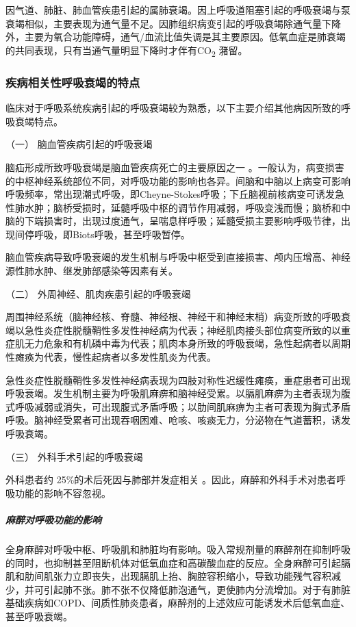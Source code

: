 因气道、肺脏、肺血管疾患引起的属肺衰竭。因上呼吸道阻塞引起的呼吸衰竭与泵衰竭相似，主要表现为通气量不足。因肺组织病变引起的呼吸衰竭除通气量下降外，主要为氧合功能障碍，通气/血流比值失调是其主要原因。低氧血症是肺衰竭的共同表现，只有当通气量明显下降时才伴有CO\textsubscript{2}
潴留。

\subsubsection{疾病相关性呼吸衰竭的特点}

临床对于呼吸系统疾病引起的呼吸衰竭较为熟悉，以下主要介绍其他病因所致的呼吸衰竭特点。

\hypertarget{text00076.htmlux5cux23CHP3-4-1-2-1}{}
（一） 脑血管疾病引起的呼吸衰竭

脑疝形成所致呼吸衰竭是脑血管疾病死亡的主要原因之一
。一般认为，病变损害的中枢神经系统部位不同，对呼吸功能的影响也各异。间脑和中脑以上病变可影响呼吸频率，常出现潮式呼吸，即Cheyne-Stokes呼吸；下丘脑视前核病变可诱发急性肺水肿；脑桥受损时，延髓呼吸中枢的调节作用减弱，呼吸变浅而慢；脑桥和中脑的下端损害时，出现过度通气，呈喘息样呼吸；延髓受损主要影响呼吸节律，出现间停呼吸，即Biots呼吸，甚至呼吸暂停。

脑血管疾病导致呼吸衰竭的发生机制与呼吸中枢受到直接损害、颅内压增高、神经源性肺水肿、继发肺部感染等因素有关。

\hypertarget{text00076.htmlux5cux23CHP3-4-1-2-2}{}
（二） 外周神经、肌肉疾患引起的呼吸衰竭

周围神经系统（脑神经核、脊髓、神经根、神经干和神经末梢）病变所致的呼吸衰竭以急性炎症性脱髓鞘性多发性神经病为代表；神经肌肉接头部位病变所致的以重症肌无力危象和有机磷中毒为代表；肌肉本身所致的呼吸衰竭，急性起病者以周期性瘫痪为代表，慢性起病者以多发性肌炎为代表。

急性炎症性脱髓鞘性多发性神经病表现为四肢对称性迟缓性瘫痪，重症患者可出现呼吸衰竭。发生机制主要为呼吸肌麻痹和脑神经受累。以膈肌麻痹为主者表现为腹式呼吸减弱或消失，可出现腹式矛盾呼吸；以肋间肌麻痹为主者可表现为胸式矛盾呼吸。脑神经受累者可出现吞咽困难、呛咳、咳痰无力，分泌物在气道蓄积，诱发呼吸衰竭。

\hypertarget{text00076.htmlux5cux23CHP3-4-1-2-3}{}
（三） 外科手术引起的呼吸衰竭

外科患者约 25\%的术后死因与肺部并发症相关
。因此，麻醉和外科手术对患者呼吸功能的影响不容忽视。

\subparagraph{麻醉对呼吸功能的影响}

全身麻醉对呼吸中枢、呼吸肌和肺脏均有影响。吸入常规剂量的麻醉剂在抑制呼吸的同时，也抑制甚至阻断机体对低氧血症和高碳酸血症的反应。全身麻醉可引起膈肌和肋间肌张力立即丧失，出现膈肌上抬、胸腔容积缩小，导致功能残气容积减少，并可引起肺不张。肺不张不仅降低肺泡通气，更使肺内分流增加。对于有肺脏基础疾病如COPD、间质性肺炎患者，麻醉剂的上述效应可能诱发术后低氧血症、甚至呼吸衰竭。

